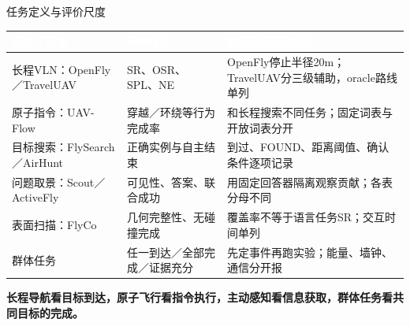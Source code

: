 \documentclass[aspectratio=169,10pt]{beamer}
\newcommand{\takeaway}[1]{\par\begin{takebox}\fontsize{9.1}{11.5}\selectfont\bfseries\color{navy}#1\end{takebox}}
\newcommand{\thd}[1]{\textcolor{white}{\bfseries #1}}
\begin{document}
\begin{frame}[t,label=protocol]{任务定义与评价尺度}
\relax
{\fontsize{8.7}{11.1}\selectfont
{}
\begin{tabularx}{\linewidth}{@{}Y{0.69}Y{1.29}Y{1.02}@{}}\toprule
{}\thd{任务／基准} & \thd{评价什么} & \thd{协议里必须固定的}\\\midrule
长程VLN：OpenFly／TravelUAV & SR、OSR、SPL、NE & OpenFly停止半径20m；TravelUAV分三级辅助，oracle路线单列\\
原子指令：UAV-Flow & 穿越／环绕等行为完成率 & 和长程搜索不同任务；固定词表与开放词表分开\\
目标搜索：FlySearch／AirHunt & 正确实例与自主结束 & 到过、FOUND、距离阈值、确认条件逐项记录\\
问题取景：Scout／ActiveFly & 可见性、答案、联合成功 & 用固定回答器隔离观察贡献；各表分母不同\\
表面扫描：FlyCo & 几何完整性、无碰撞完成 & 覆盖率不等于语言任务SR；交互时间单列\\
群体任务 & 任一到达／全部完成／证据充分 & 先定事件再跑实验；能量、墙钟、通信分开报\\
\bottomrule\end{tabularx}\par}
\takeaway{长程导航看目标到达，原子飞行看指令执行，主动感知看信息获取，群体任务看共同目标的完成。}

\end{frame}
\end{document}
